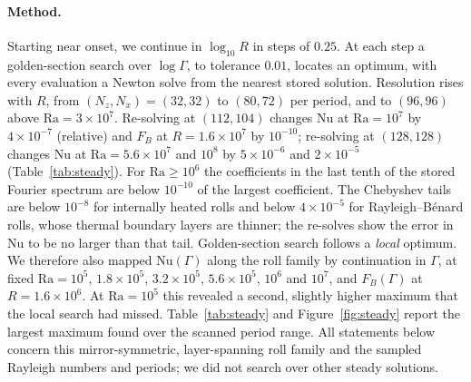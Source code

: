 \paragraph{Method.} Starting near onset, we continue in $\log_{10}R$ in steps of $0.25$. At each step a
golden-section search over $\log\Gamma$, to tolerance $0.01$, locates an optimum, with every evaluation a Newton
solve from the nearest stored solution. Resolution rises with $R$, from $(N_z,N_x)=(32,32)$ to $(80,72)$ per
period, and to $(96,96)$ above $\mathrm{Ra}=3\times10^7$. Re-solving at $(112,104)$ changes Nu at
$\mathrm{Ra}=10^7$ by $4\times10^{-7}$ (relative) and $F_B$ at $R=1.6\times10^7$ by $10^{-10}$; re-solving at
$(128,128)$ changes Nu at $\mathrm{Ra}=5.6\times10^7$ and $10^8$ by $5\times10^{-6}$ and $2\times10^{-5}$
(Table~\ref{tab:steady}). For $\mathrm{Ra}\ge10^6$ the coefficients in the last tenth of the stored Fourier
spectrum are below $10^{-10}$ of the largest coefficient. The Chebyshev tails are below $10^{-8}$ for internally
heated rolls and below $4\times10^{-5}$ for Rayleigh--B\'enard rolls, whose thermal boundary layers are thinner;
the re-solves show the error in Nu to be no larger than that tail. Golden-section search follows a \emph{local}
optimum. We therefore also mapped $\mathrm{Nu}(\Gamma)$ along the roll family by continuation in $\Gamma$, at
fixed $\mathrm{Ra}=10^5$, $1.8\times10^5$, $3.2\times10^5$, $5.6\times10^5$, $10^6$ and $10^7$, and $F_B(\Gamma)$
at $R=1.6\times10^6$. At $\mathrm{Ra}=10^5$ this revealed a second, slightly higher maximum that the local search
had missed. Table~\ref{tab:steady} and Figure~\ref{fig:steady} report the largest maximum found over the scanned
period range. All statements below concern this mirror-symmetric, layer-spanning roll family and the sampled
Rayleigh numbers and periods; we did not search over other steady solutions.


